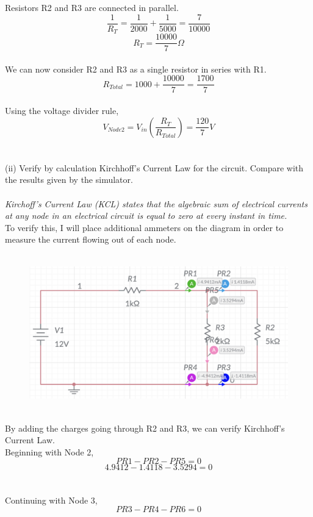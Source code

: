 \documentclass[12pt]{article}
\begin{document}
Resistors R2 and R3 are connected in parallel.
\[\frac{1}{R_T} = \frac{1}{2000} + \frac{1}{5000} = \frac{7}{10000}\]
\[R_T = \frac{10000}{7}\Omega\]\\
We can now consider R2 and R3 as a single resistor in series with R1.\\
\[R_{Total} = 1000 + \frac{10000}{7} = \frac{1700}{7}\]\\
Using the voltage divider rule,
\[V_{Node 2} = V_{in}(\frac{R_T}{R_{Total}}) = \frac{120}{7}V\]\\
\\
(ii) Verify by calculation Kirchhoff's Current Law for the circuit. Compare with the results given by the simulator.\\
\\
\textit{Kirchoff’s Current Law (KCL) states that the algebraic sum of electrical currents at any node in an electrical circuit is equal to zero at every instant in time.}\\
To verify this, I will place additional ammeters on the diagram in order to measure the current flowing out of each node.\\
\\
\begin{figure}[!h] 
	\begin{centering}
		\includegraphics[keepaspectratio = true, width = 5in]{Q1(ii).png}
	\end{centering}
\end{figure}\\
\noindent By adding the charges going through R2 and R3, we can verify Kirchhoff's Current Law.\\
Beginning with Node 2,\\
\[PR1 - PR2 - PR5 = 0\]
\[4.9412 - 1.4118 - 3.5294 = 0\]\\
\\
Continuing with Node 3,\\
\[PR3 - PR4 - PR6 = 0\]
\end{document}
